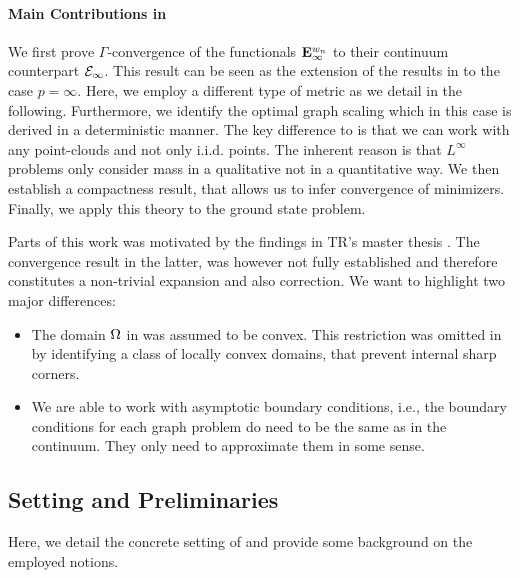 \paragraph{Main Contributions in \cite{roith2022continuum}} We first prove $\Gamma$-convergence of the functionals $\mathbf{E}^{w_n}_\infty$ to their continuum counterpart $\mathcal{E}_\infty$. This result can be seen as the extension of the results in \cite{GarcSlep15, slepcev2019analysis} to the case $p=\infty$. Here, we employ a different type of metric as we detail in the following. Furthermore, we identify the optimal graph scaling which in this case is derived in a deterministic manner. The key difference to \cite{GarcSlep15, slepcev2019analysis} is that we can work with any point-clouds and not only i.i.d. points. The inherent reason is that $L^\infty$ problems only consider mass in a qualitative not in a quantitative way. We then establish a compactness result, that allows us to infer convergence of minimizers. Finally, we apply this theory to the ground state problem.

Parts of this work was motivated by the findings in TR's master thesis \cite{roith2022msc}. The convergence result in the latter, was however not fully established and therefore \cite{roith2022continuum} constitutes a non-trivial expansion and also correction. We want to highlight two major differences:
%
\begin{itemize}
\item The domain $\Omega$ in \cite{roith2022msc} was assumed to be convex. This restriction was omitted in \cite{roith2022continuum} by identifying a class of locally convex domains, that prevent internal sharp corners.
\item We are able to work with asymptotic boundary conditions, i.e., the boundary conditions for each graph problem do need to be the same as in the continuum. They only need to approximate them in some sense. 
\end{itemize} 
%
%
%
%
\subsection{Setting and Preliminaries}
%
Here, we detail the concrete setting of \cite{roith2022continuum} and provide some background on the employed notions.
%
%
